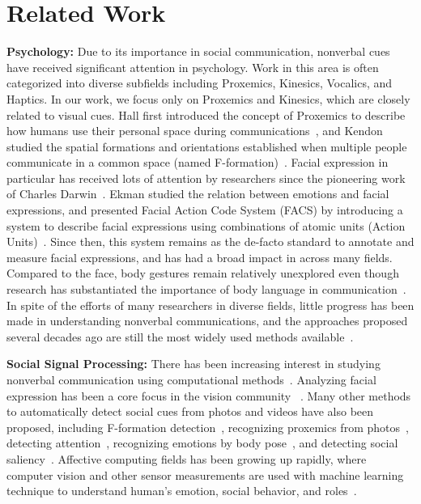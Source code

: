 \section{Related Work}

\textbf{Psychology:}
Due to its importance in social communication, nonverbal cues have received significant attention in psychology. Work in this area is often categorized into diverse subfields including Proxemics, Kinesics, Vocalics, and Haptics. In our work, we focus only on Proxemics and Kinesics, which are closely related to visual cues. Hall first introduced the concept of Proxemics to describe how humans use their personal space during communications~\cite{Hall66}, and Kendon studied the spatial formations and orientations established when multiple people communicate in a common space (named F-formation)~\cite{kendon90}. Facial expression in particular has received lots of attention by researchers since the pioneering work of Charles Darwin~\cite{Darwin-1872}. Ekman studied the relation between emotions and facial expressions, and presented Facial Action Code System (FACS) by introducing a system to describe facial expressions using combinations of atomic units (Action Units)~\cite{ekman1977facial}. Since then, this system remains as the de-facto standard to annotate and measure facial expressions, and has had a broad impact in across many fields. Compared to the face, body gestures remain relatively unexplored even though research has substantiated the importance of body language in communication~\cite{Gelder09, Moore13, Meeren-2005, Aviezer-2012}. In spite of the efforts of many researchers in diverse fields, little progress has been made in understanding nonverbal communications, and the approaches proposed several decades ago are still the most widely used methods available~\cite{Moore13}. %

\textbf{Social Signal Processing:}
There has been increasing interest in studying nonverbal communication using computational methods~\cite{vinciarelli2009social, vinciarelli2012bridging}. Analyzing facial expression has been a core focus in the vision community ~\cite{ChuDC13, Torre15, shan2009facial}. Many other methods to automatically detect social cues from photos and videos have also been proposed, including F-formation detection~\cite{setti2015f}, recognizing proxemics from photos~\cite{yang2012recognizing}, detecting attention~\cite{Fathi-2012}, recognizing emotions by body pose~\cite{schindler2008recognizing}, and detecting social saliency~\cite{park20123d}. Affective computing fields has been growing up rapidly, where computer vision and other sensor measurements are used with machine learning technique to understand human's emotion, social behavior, and roles~\cite{picard1997affective}. 

